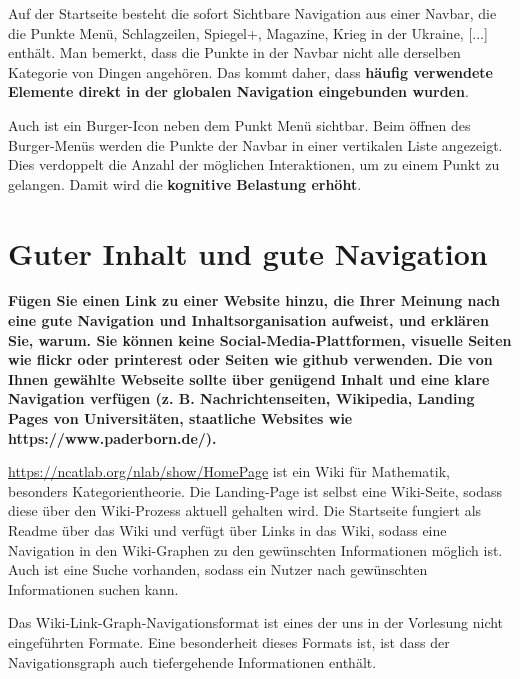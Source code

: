 \documentclass[a4paper,12pt]{article}
\begin{document}

Auf der Startseite besteht die sofort Sichtbare Navigation aus einer
Navbar, die die Punkte Menü, Schlagzeilen, Spiegel+, Magazine, Krieg in der Ukraine, [...] enthält.
Man bemerkt, dass die Punkte in der Navbar nicht alle derselben Kategorie von
Dingen angehören. Das kommt daher, dass \textbf{häufig verwendete Elemente direkt
  in der globalen Navigation eingebunden wurden}.

Auch ist ein Burger-Icon neben dem Punkt Menü sichtbar. Beim öffnen des
Burger-Menüs werden die Punkte der Navbar in einer vertikalen Liste angezeigt.
Dies verdoppelt die Anzahl der möglichen Interaktionen, um zu einem Punkt
zu gelangen. Damit wird die \textbf{kognitive Belastung erhöht}.

\section{Guter Inhalt und gute Navigation}
\textbf{Fügen Sie einen Link zu einer Website hinzu, die
  Ihrer Meinung nach eine gute Navigation und Inhaltsorganisation aufweist, und
  erklären Sie, warum. Sie können keine Social-Media-Plattformen, visuelle Seiten wie
  flickr oder printerest oder Seiten wie github verwenden. Die von Ihnen gewählte
  Webseite sollte über genügend Inhalt und eine klare Navigation verfügen (z. B.
  Nachrichtenseiten, Wikipedia, Landing Pages von Universitäten, staatliche Websites
  wie https://www.paderborn.de/).}

\url{https://ncatlab.org/nlab/show/HomePage} ist ein Wiki für Mathematik, besonders
Kategorientheorie. Die Landing-Page ist selbst eine Wiki-Seite, sodass diese
über den Wiki-Prozess aktuell gehalten wird. Die Startseite fungiert als Readme über
das Wiki und verfügt über Links in das Wiki, sodass eine Navigation in den Wiki-Graphen
zu den gewünschten Informationen möglich ist. Auch ist eine Suche vorhanden, sodass
ein Nutzer nach gewünschten Informationen suchen kann.

Das Wiki-Link-Graph-Navigationsformat ist eines der uns in der Vorlesung nicht
eingeführten Formate. Eine besonderheit dieses Formats ist, ist dass der Navigationsgraph
auch tiefergehende Informationen enthält.
\end{document}
